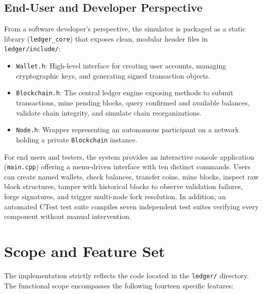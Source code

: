 \documentclass[11pt,a4paper]{report}
\begin{document}
\subsection*{End-User and Developer Perspective}

From a software developer's perspective, the simulator is packaged as a static library (\texttt{ledger\_core}) that exposes clean, modular header files in \texttt{ledger/include/}:
\begin{itemize}
    \item \texttt{Wallet.h}: High-level interface for creating user accounts, managing cryptographic keys, and generating signed transaction objects.
    \item \texttt{Blockchain.h}: The central ledger engine exposing methods to submit transactions, mine pending blocks, query confirmed and available balances, validate chain integrity, and simulate chain reorganizations.
    \item \texttt{Node.h}: Wrapper representing an autonomous participant on a network holding a private \texttt{Blockchain} instance.
\end{itemize}

For end users and testers, the system provides an interactive console application (\texttt{main.cpp}) offering a menu-driven interface with ten distinct commands. Users can create named wallets, check balances, transfer coins, mine blocks, inspect raw block structures, tamper with historical blocks to observe validation failures, forge signatures, and trigger multi-node fork resolution. In addition, an automated CTest test suite compiles seven independent test suites verifying every component without manual intervention.

\clearpage

\section{Scope and Feature Set}

The implementation strictly reflects the code located in the \texttt{ledger/} directory. The functional scope encompasses the following fourteen specific features:
\end{document}
